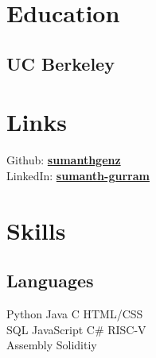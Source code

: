 \documentclass[]{deedy-resume-openfont}
\begin{document}
%
%
\lastupdated

%
%

%
%

\begin{minipage}[t]{0.33\textwidth} 


\section{Education} 

\subsection{UC Berkeley}

    
\sectionsep



\section{Links} 
Github: \href{https://github.com/sumanthgenz}{\bf sumanthgenz} \\
LinkedIn:  \href{https://www.linkedin.com/in/sumanth-gurram}{\bf sumanth-gurram} \\


\section{Skills}
\subsection{Languages}
Python \textbullet{} Java \textbullet{} C \textbullet{} HTML/CSS \textbullet{} \\
SQL \textbullet{} JavaScript \textbullet{} C\#  \textbullet{} RISC-V \\ Assembly 
\textbullet{} Soliditiy  


\end{minipage}
\end{document}
